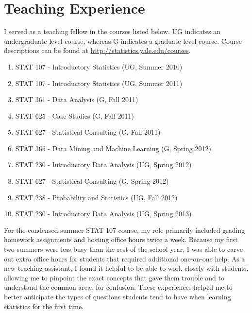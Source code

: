\documentclass[11pt]{article}
\begin{document}
\section{Teaching Experience}
%
I served as a teaching fellow in the courses listed below. UG indicates an undergraduate level course, whereas G indicates a graduate level course. Course descriptions can be found at \url{http://statistics.yale.edu/courses}.
\begin{enumerate}
  \item STAT 107 - Introductory Statistics (UG, Summer 2010)
  \item STAT 107 - Introductory Statistics (UG, Summer 2011)
  \item STAT 361 - Data Analysis (G, Fall 2011)
  \item STAT 625 - Case Studies (G, Fall 2011)
  \item STAT 627 - Statistical Consulting (G, Fall 2011)
  \item STAT 365 - Data Mining and Machine Learning (G, Spring 2012)
  \item STAT 230 - Introductory Data Analysis (UG, Spring 2012)
  \item STAT 627 - Statistical Consulting (G, Spring 2012)
  \item STAT 238 - Probability and Statistics (UG, Fall 2012)
  \item STAT 230 - Introductory Data Analysis (UG, Spring 2013)
\end{enumerate}
 For the condensed summer STAT 107 course, my role primarily included grading homework assignments and hosting office hours twice a week. Because my first two summers were less busy than the rest of the school year, I was able to carve out extra office hours for students that required additional one-on-one help. As a new teaching assistant, I found it helpful to be able to work closely with students, allowing me to pinpoint the exact concepts that gave them trouble and to understand the common areas for confusion. These experiences helped me to better anticipate the types of questions students tend to have when learning statistics for the first time.
\end{document}
